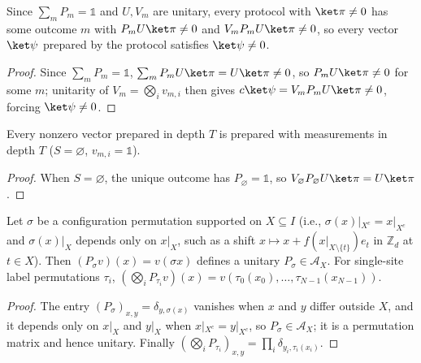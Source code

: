 \begin{lemma}
    \label{lem:qc_measurement_outcomes}
    \leanok
    Since $\sum_m P_m=\mathbb 1$ and $U,V_m$ are unitary, every protocol with $\ket\pi\neq0$ has some outcome $m$ with $P_mU\ket\pi\neq0$ and $V_mP_mU\ket\pi\neq0$, so every vector $\ket\psi$ prepared by the protocol satisfies $\ket\psi\neq0$.
\end{lemma}
\begin{proof}
    \leanok
    Since $\sum_m P_m=\mathbb 1$, $\sum_m P_mU\ket\pi=U\ket\pi\neq0$, so $P_mU\ket\pi\neq0$ for some $m$; unitarity of $V_m=\bigotimes_i v_{m,i}$ then gives $c\ket\psi=V_mP_mU\ket\pi\neq0$, forcing $\ket\psi\neq0$.
\end{proof}

\begin{lemma}
    \label{lem:qc_measurement_unitary_case}
    \leanok
    Every nonzero vector prepared in depth $T$ is prepared with measurements in depth $T$ ($S=\varnothing$, $v_{m,i}=\mathbb 1$).
\end{lemma}
\begin{proof}
    \leanok
    When $S=\varnothing$, the unique outcome has $P_\varnothing=\mathbb 1$, so $V_\varnothing P_\varnothing U\ket\pi=U\ket\pi$.
\end{proof}

\begin{lemma}
    \label{lem:qc_permutation_layers}
    \leanok
    Let $\sigma$ be a configuration permutation supported on $X\subseteq I$ (i.e., $\sigma(x)|_{X^c}=x|_{X^c}$ and $\sigma(x)|_X$ depends only on $x|_X$, such as a shift $x\mapsto x+f(x|_{X\setminus\{t\}})e_t$ in $\mathbb Z_d$ at $t\in X$). Then $(P_\sigma v)(x)=v(\sigma x)$ defines a unitary $P_\sigma\in\mathcal A_X$. For single-site label permutations $\tau_i$, $(\bigotimes_i P_{\tau_i}v)(x)=v(\tau_0(x_0),\dots,\tau_{N-1}(x_{N-1}))$.
\end{lemma}
\begin{proof}
    \leanok
    The entry $(P_\sigma)_{x,y}=\delta_{y,\sigma(x)}$ vanishes when $x$ and $y$ differ outside $X$, and it depends only on $x|_X$ and $y|_X$ when $x|_{X^c}=y|_{X^c}$, so $P_\sigma\in\mathcal A_X$; it is a permutation matrix and hence unitary. Finally $(\bigotimes_i P_{\tau_i})_{x,y}=\prod_i\delta_{y_i,\tau_i(x_i)}$.
\end{proof}

